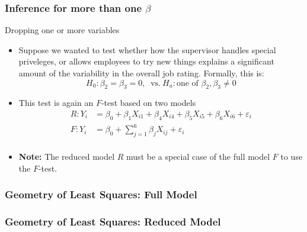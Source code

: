 \documentclass[handout]{beamer}
\begin{document}

   \begin{frame} \frametitle{Inference for more than one $\beta$}

   \begin{block}
   {Dropping one or more variables}
   \begin{itemize}

   \item       Suppose we wanted to test whether how the supervisor
   handles special priveleges, or allows employees to try new things
   explains a significant amount of the variability in the overall job rating. Formally, this is:
   $$
   H_0:\beta_{2}=\beta_3=0, \  \text{ vs.} \  H_a: \text{one of $\beta_2, \beta_3 \neq 0$}$$

   \item This test is again an $F$-test based on two models
   $$
   \begin{aligned}
   R: Y_i &= \beta_0 + \beta_1 X_{i1} + \beta_4 X_{i4} + \beta_5 X_{i5} + \beta_6 X_{i6} + \varepsilon_i \\
   F: Y_i &= \beta_0 + \sum_{j=1}^6 \beta_j X_{ij} + \varepsilon_i \\
   \end{aligned}
   $$

   \item {\bf Note:} The reduced model $R$ must be a special case of the full model $F$ to use the $F$-test.
   \end{itemize}
   \end{block}
   \end{frame}


   \begin{frame} \frametitle{Geometry of Least Squares: Full Model}

   \end{frame}


   \begin{frame} \frametitle{Geometry of Least Squares: Reduced Model}

   \end{frame}
\end{document}
